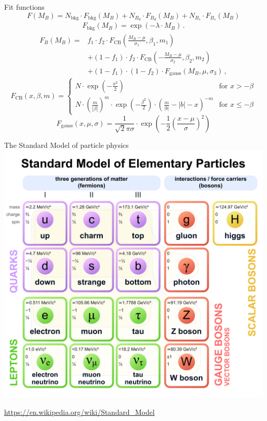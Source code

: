 \documentclass[aspectratio=1610, 10pt]{beamer}
\begin{document}
\begin{frame}{Fit functions}
  \begin{equation*}
    F(M_B) = N_\text{bkg} \cdot F_\text{bkg}(M_B) + N_{B_d} \cdot F_{B_d}(M_B) + N_{B_s} \cdot F_{B_s}(M_B)
  \end{equation*}
  \begin{align*}
    F_\text{bkg}(M_B) = \exp(-\lambda \cdot M_B) \, .
  \end{align*}
  \begin{align*}
    F_B(M_B) = &f_1 \cdot f_2 \cdot F_\text{CB}\left(\frac{M_B-\mu}{\sigma_1}, \beta_1, m_1\right) \nonumber\\
                &+ (1-f_1) \cdot f_2 \cdot F_\text{CB}\left(-\frac{M_B-\mu}{\sigma_2}, \beta_2, m_2\right) \nonumber\\
                &+ (1-f_1) \cdot (1-f_2) \cdot F_\text{gauss}\left(M_B,\mu,\sigma_3\right) \, , \label{eqn:FB}
  \end{align*}
  \begin{equation*}
    F_\text{CB}(x,\beta,m) = 
    \begin{cases}
        N \cdot \exp(-\frac{x^2}{2}) & \text{for } x > -\beta \\
        N \cdot \left(\frac{m}{|\beta|}\right)^m \cdot \exp\left(-\frac{\beta^2}{2}\right) \cdot \left(\frac{m}{|b|}-|b| - x\right)^{-m} & \text{for } x \leq -\beta
    \end{cases}
  \end{equation*}
  \begin{equation*}
    F_\text{gauss}\left(x,\mu,\sigma\right) = \frac{1}{\sqrt{2}\pi\sigma} \cdot \exp\left(-\frac{1}{2}\left(\frac{x-\mu}{\sigma}\right)^2\right)
  \end{equation*}
\end{frame}

\begin{frame}{The Standard Model of particle physics}
  \centering
  \includegraphics[height=0.9\textheight]{images/standard_model.pdf}

  \tiny \url{https://en.wikipedia.org/wiki/Standard_Model}
\end{frame}
\end{document}
